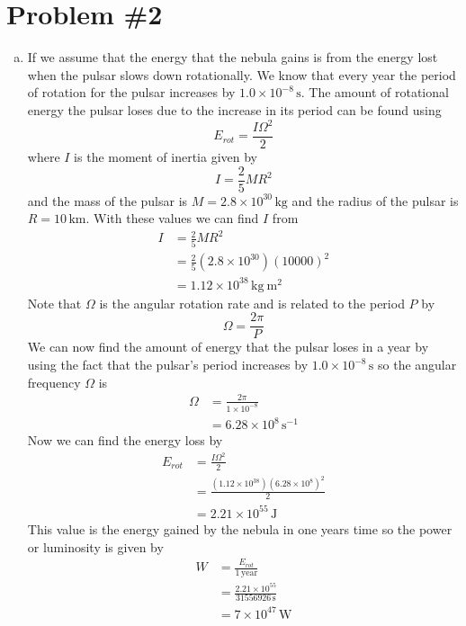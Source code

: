 \documentclass[11pt]{article}
\numberwithin{equation}{section}
\newcommand{\unit}[1]{\ensuremath{\, \mathrm{#1}}}
\begin{document}
\section{Problem \#2}
\begin{enumerate}[(a)]
\item
If we assume that the energy that the nebula gains is from the energy lost when the pulsar slows down rotationally. We know that every year the period of rotation for the pulsar increases by $1.0\times10^{-8}\unit{s}$. The amount of rotational energy the pulsar loses due to the increase in its period can be found using
$$E_{rot} = \frac{I\Omega^2}{2}$$
where $I$ is the moment of inertia given by
$$I = \frac{2}{5}MR^2$$
and the mass of the pulsar is $M=2.8\times10^{30}\unit{kg}$ and the radius of the pulsar is $R=10\unit{km}$. With these values we can find $I$ from
\begin{align*}
I &= \frac{2}{5}MR^2\\
&= \frac{2}{5}(2.8\times10^{30})(10000)^2\\
&= 1.12\times10^{38}\unit{kg\ m^2}
\end{align*}
Note that $\Omega$ is the angular rotation rate and is related to the period $P$ by
$$\Omega = \frac{2\pi}{P}$$
We can now find the amount of energy that the pulsar loses in a year by using the fact that the pulsar's period increases by $1.0\times10^{-8}\unit{s}$ so the angular frequency $\Omega$ is
\begin{align*}
\Omega &= \frac{2\pi}{1\times10^{-8}}\\
&= 6.28\times10^{8}\unit{s^{-1}}
\end{align*}
Now we can find the energy loss by
\begin{align*}
E_{rot} &= \frac{I\Omega^2}{2}\\
&= \frac{(1.12\times10^{38})(6.28\times10^8)^2}{2}\\
&= 2.21\times10^{55}\unit{J}
\end{align*}
This value is the energy gained by the nebula in one years time so the power or luminosity is given by
\begin{align*}
W &= \frac{E_{rot}}{1\unit{year}}\\
&= \frac{2.21\times10^{55}}{31556926\unit{s}}\\
&= 7\times10^{47}\unit{W}
\end{align*}


\end{enumerate}
\end{document}
